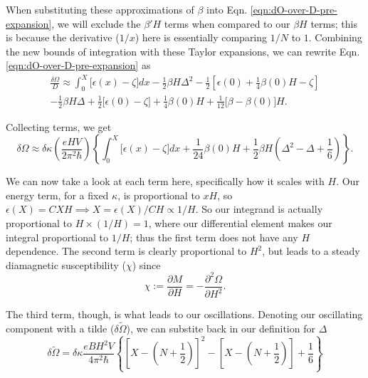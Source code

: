 \documentclass[12pt]{revtex4-2}
\begin{document}
When substituting these approximations of $\beta$ into Eqn. \ref{eqn:dO-over-D-pre-expansion}, we will exclude the $\beta'H$ terms when compared to our $\beta H$ terms; this is because the derivative ($1/x$) here is essentially comparing $1/N$ to $1$.  Combining the new bounds of integration with these Taylor expansions, we can rewrite Eqn. \ref{eqn:dO-over-D-pre-expansion} as 
\begin{multline}
    \frac{\delta\Omega}{D} \approx \int_0^X \big[\epsilon(x)-\zeta\big]dx  - \frac{1}{2}\beta H \Delta^2 - \frac{1}{2}\left[ \epsilon(0) + \frac{1}{4}\beta(0)H - \zeta \right] \\
     - \frac{1}{2}\beta H\Delta + \frac{1}{2}\big[\epsilon(0)-\zeta\big] + \frac{1}{4}\beta(0)H + \frac{1}{12}\big[ \beta - \beta(0) \big]H.
\end{multline}

Collecting terms, we get 
\begin{equation}
    \delta \Omega \approx \delta\kappa\left( \frac{eHV}{2\pi^2\hbar} \right)\left\{ \int_0^X \big[\epsilon(x)-\zeta\big]dx + \frac{1}{24}\beta(0)H + \frac{1}{2}\beta H\left( \Delta^2 - \Delta + \frac{1}{6} \right) \right\}.
\end{equation}

We can now take a look at each term here, specifically how it scales with $H$.  Our energy term, for a fixed $\kappa$, is proportional to $xH$, so $\epsilon(X) = CXH \implies X = \epsilon(X)/CH \propto 1/H$.  So our integrand is actually proportional to $H\times(1/H)=1$, where our differential element makes our integral proportional to $1/H$; thus the first term does not have any $H$ dependence.  The second term is clearly proportional to $H^2$, but leads to a steady diamagnetic susceptibility ($\chi$) since
\begin{equation}
    \chi := \frac{\partial M}{\partial H} = -\frac{\partial^2\Omega}{\partial H^2}.
\end{equation}

The third term, though, is what leads to our oscillations.  Denoting our oscillating component with a tilde ($\delta\tilde{\Omega}$), we can substite back in our definition for $\Delta$
\begin{equation}\label{eqn:potential-step}
    \boxed{\delta\tilde{\Omega} = \delta \kappa \frac{eBH^2V}{4\pi^2\hbar} \left\{ \left[ X - \left( N + \frac{1}{2} \right)\right]^2 - \left[ X - \left( N + \frac{1}{2} \right)\right] + \frac{1}{6} \right\}}
\end{equation}
\end{document}

